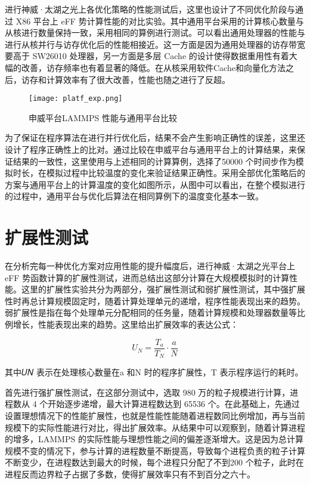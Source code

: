 进行神威·太湖之光上各优化策略的性能测试后，这里也设计了不同优化阶段与通过 X86 平台上 eFF 势计算性能的对比实验。其中通用平台采用的计算核心数量与从核进行数量保持一致，采用相同的算例进行测试。可以看出通用处理器的性能与进行从核并行与访存优化后的性能相接近。这一方面是因为通用处理器的访存带宽要高于 SW26010 处理器，另一方面是多层 Cache 的设计使得数据重用性有着大幅的改善，访存频率也有着显著的降低。在从核采用软件Cache和向量化方法之后，访存和计算效率有了很大改善，性能也随之进行了反超。

 \begin{figure}[h]
  \centering
  \texttt{[image: platf\_exp.png]}
  \caption{申威平台LAMMPS 性能与通用平台比较}
\end{figure}

为了保证在程序算法在进行并行优化后，结果不会产生影响正确性的误差，这里还设计了程序正确性上的比对。通过比较在申威平台与通用平台上的计算结果，来保证结果的一致性，这里使用与上述相同的计算算例，选择了50000 个时间步作为模拟时长，在模拟过程中比较温度的变化来验证结果正确性。采用全部优化策略后的方案与通用平台上的计算温度的变化如图所示，从图中可以看出，在整个模拟进行的过程中，通用平台与优化后算法在相同算例下的温度变化基本一致。

\section{扩展性测试}
在分析完每一种优化方案对应用性能的提升幅度后，进行神威·太湖之光平台上 eFF 势函数计算的扩展性测试，进而总结出这部分计算在大规模模拟时的计算性能。这里的扩展性实验共分为两部分，强扩展性测试和弱扩展性测试，其中强扩展性时再总计算规模固定时，随着计算处理单元的递增，程序性能表现出来的趋势。弱扩展性是指在每个处理单元分配相同的任务量，随着计算规模和处理器数量等比例增长，性能表现出来的趋势。这里给出扩展效率的表达公式：

\begin{equation}
  U_N=\frac{T_a}{T_N}\cdot \frac{a}{N}
\end{equation}

其中𝑈𝑁 表示在处理核心数量在a 和N 时的程序扩展性，T 表示程序运行的耗时。

首先进行强扩展性测试，在这部分测试中，选取 980 万的粒子规模进行计算，进程数从 4 个开始逐步递增，最大计算进程数达到 65536 个。在此基础上，先通过设置理想情况下的性能扩展性，也就是性能性能随着进程数同比例增加，再与当前规模下的实际性能进行对比，得出扩展效率。从结果中可以观察到，随着计算进程的增多，LAMMPS 的实际性能与理想性能之间的偏差逐渐增大。这是因为总计算规模不变的情况下，参与计算的进程数量不断提高，导致每个进程负责的粒子计算不断变少，在进程数达到最大的时候，每个进程只分配了不到200 个粒子，此时在进程反而边界粒子占据了多数，使得扩展效率只有不到百分之六十。

